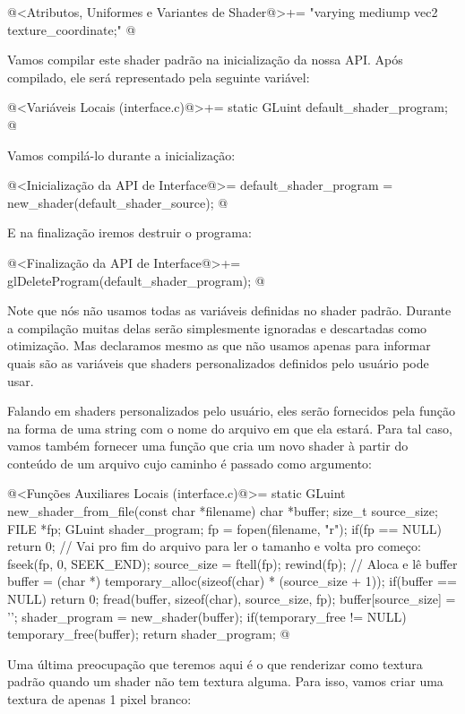 \iniciocodigo
@<Atributos, Uniformes e Variantes de Shader@>+=
"varying mediump vec2 texture_coordinate;\n"
@
\fimcodigo

Vamos compilar este shader padrão na inicialização da nossa API. Após
compilado, ele será representado pela seguinte variável:

\iniciocodigo
@<Variáveis Locais (interface.c)@>+=
static GLuint default_shader_program;
@
\fimcodigo

Vamos compilá-lo durante a inicialização:

\iniciocodigo
@<Inicialização da API de Interface@>=
default_shader_program = new_shader(default_shader_source);
@
\fimcodigo

E na finalização iremos destruir o programa:

\iniciocodigo
@<Finalização da API de Interface@>+=
glDeleteProgram(default_shader_program);
@
\fimcodigo

Note que nós não usamos todas as variáveis definidas no shader
padrão. Durante a compilação muitas delas serão simplesmente ignoradas
e descartadas como otimização. Mas declaramos mesmo as que não usamos
apenas para informar quais são as variáveis que shaders personalizados
definidos pelo usuário pode usar.

Falando em shaders personalizados pelo usuário, eles serão fornecidos
pela função  na forma de uma string com
o nome do arquivo em que ela estará. Para tal caso, vamos também
fornecer uma função que cria um novo shader à partir do conteúdo de um
arquivo cujo caminho é passado como argumento:

\iniciocodigo
@<Funções Auxiliares Locais (interface.c)@>=
static GLuint new_shader_from_file(const char *filename){
  char *buffer;
  size_t source_size;
  FILE *fp;
  GLuint shader_program;
  fp = fopen(filename, "r");
  if(fp == NULL)  return 0;
  // Vai pro fim do arquivo para ler o tamanho e volta pro começo:
  fseek(fp, 0, SEEK_END);
  source_size = ftell(fp);
  rewind(fp);
  // Aloca e lê buffer
  buffer = (char *) temporary_alloc(sizeof(char) * (source_size + 1));
  if(buffer == NULL) return 0;
  fread(buffer, sizeof(char), source_size, fp);
  buffer[source_size] = '\0';
  shader_program = new_shader(buffer);
  if(temporary_free != NULL) temporary_free(buffer);
  return shader_program;
}
@
\fimcodigo


Uma última preocupação que teremos aqui é o que renderizar como textura
padrão quando um shader não tem textura alguma. Para isso, vamos criar
uma textura de apenas 1 pixel branco:

